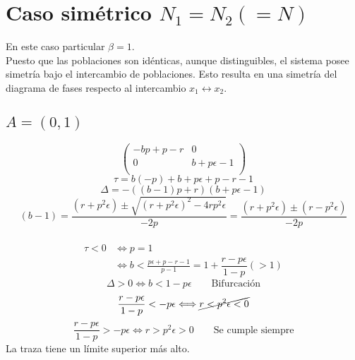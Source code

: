 \documentclass[11pt]{article}
\begin{document}
\section*{Caso simétrico $N_1=N_2(=N)$}
En este caso particular $\beta=1$.\\
Puesto que las poblaciones son idénticas, aunque distinguibles, el sistema posee simetría bajo el intercambio de poblaciones. Esto resulta en una simetría del diagrama de fases respecto al intercambio $x_1\longleftrightarrow x_2$.

\subsection*{$A=(0,1)$}
\begin{equation*}
\left(
\begin{array}{cc}
 -b p+p-r & 0 \\
 0 & b+p \epsilon -1 \\
\end{array}
\right)
\end{equation*}
\begin{equation*}
\tau= b (-p)+b+p \epsilon +p-r-1
\end{equation*}
\begin{equation}
\Delta=-((b-1) p+r) (b+p \epsilon -1)
\end{equation}
\begin{equation*}
(b-1)=\dfrac{(r+p^2\epsilon)\pm\sqrt{(r+p^2\epsilon)^2-4rp^2\epsilon}}{-2p}=\dfrac{(r+p^2\epsilon)\pm(r-p^2\epsilon)}{-2p}
\end{equation*}\\

\begin{equation}
\begin{split}
\tau<0&\Longleftrightarrow p=1 \\
&\Longleftrightarrow b<\frac{p \epsilon +p-r-1}{p-1}=1+\dfrac{r-p\epsilon}{1-p}(>1)
\end{split}
\end{equation}
\begin{equation}
\Delta>0\Longleftrightarrow b<1-p\epsilon\qquad\text{Bifurcación}
\end{equation}
\begin{equation}
\dfrac{r-p\epsilon}{1-p}<-p\epsilon\Longleftrightarrow  \cancel{r<p^2\epsilon<0}
\end{equation}
\begin{equation}
\dfrac{r-p\epsilon}{1-p}>-p\epsilon\Longleftrightarrow  r>p^2\epsilon>0\qquad\text{Se cumple siempre}
\end{equation}
La traza tiene un límite superior más alto.
\end{document}
